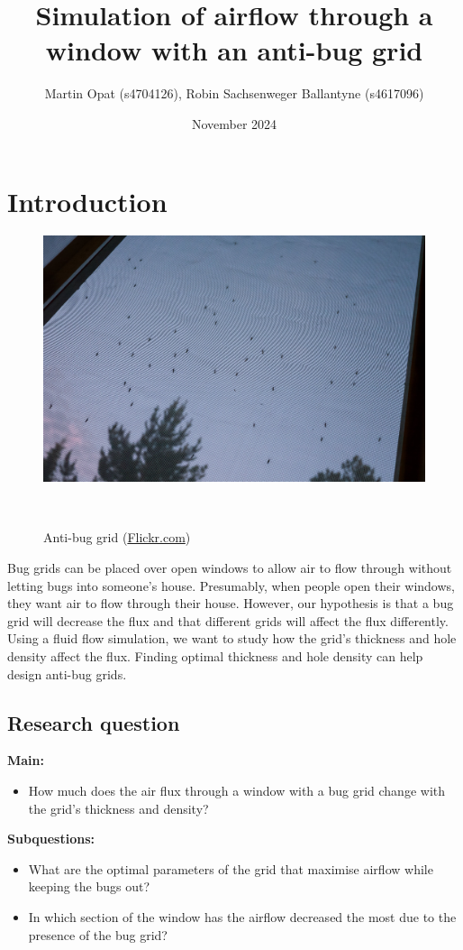 \documentclass{article}
\title{Simulation of airflow through a window with an anti-bug grid}
\author{Martin Opat (s4704126), Robin Sachsenweger Ballantyne (s4617096)}
\date{November 2024}
\numberwithin{figure}{section}  %
\numberwithin{equation}{section}  %
\begin{document}
\maketitle



\section{Introduction}

\begin{figure}
\vspace{-2cm}
\includegraphics[width=0.9\linewidth]{figures/mosquitogrid.jpg}
\caption{Anti-bug grid (\href{https://www.flickr.com/photos/neekohfi/7817306994/}{Flickr.com})}\
\end{figure}

Bug grids can be placed over open windows to allow air to flow through without letting bugs into someone's house. Presumably, when people open their windows, they want air to flow through their house. However, our hypothesis is that a bug grid will decrease the flux and that different grids will affect the flux differently. Using a fluid flow simulation, we want to study how the grid's thickness and hole density affect the flux. Finding optimal thickness and hole density can help design anti-bug grids.

\subsection{Research question}
\textbf{Main:}
\begin{itemize}
    \item How much does the air flux through a window with a bug grid change with the grid's thickness and density?
\end{itemize}
\textbf{Subquestions:}
\begin{itemize}
    \item What are the optimal parameters of the grid that maximise airflow while keeping the bugs out?
    \item In which section of the window has the airflow decreased the most due to the presence of the bug grid?
\end{itemize}
\end{document}
